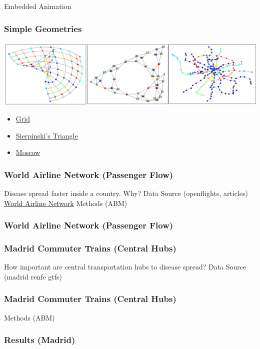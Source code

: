 \documentclass{beamer}
\begin{document}
\begin{frame}{Embedded Animation}
\frametitle{Simple Geometries}
\includegraphics[width=1.0\textwidth]{Scratch_Visuals/geometries_example.png}
\begin{itemize}
    \item \href{https://github.com/cheung-ho-lum/NS_Epidemics_ABM_Approach/blob/master/Repository/Visualizations/infection_timelapse_grid_01.gif}{Grid}
    \item \href{https://github.com/cheung-ho-lum/NS_Epidemics_ABM_Approach/blob/master/Repository/Visualizations/infection_timelapse_sierpinski_01.gif}{Sierpinski's Triangle}
    \item \href{https://github.com/cheung-ho-lum/NS_Epidemics_ABM_Approach/blob/master/Repository/Visualizations/infection_timelapse_moscow.gif}{Moscow}
\end{itemize}
\end{frame}
\begin{frame}
\frametitle{World Airline Network (Passenger Flow)}
Disease spread faster inside a country. Why?
Data Source (openflights, articles)
\href{https://github.com/cheung-ho-lum/NS_Epidemics_ABM_Approach/blob/master/Repository/Visualizations/infection_timelapse_world.gif}{World Airline Network}
Methods (ABM)
\end{frame}
\begin{frame}
\frametitle{World Airline Network (Passenger Flow)}
\end{frame}
\begin{frame}
\frametitle{Madrid Commuter Trains (Central Hubs)}
How important are central transportation hubs to disease spread?
Data Source (madrid renfe gtfs)
\end{frame}
\begin{frame}
\frametitle{Madrid Commuter Trains (Central Hubs)}
Methods (ABM)
\end{frame}
\begin{frame}
\frametitle{Results (Madrid)}
\end{frame}
\end{document}
